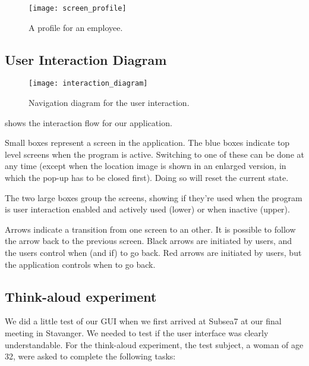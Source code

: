 \begin{figure}[H]
    \centerline{ \texttt{[image: screen\_profile]} }
    \caption{A profile for an employee.}
    \label{fig:screen_profile}
\end{figure}

\clearpage

\subsection{User Interaction Diagram}

\begin{figure}[H]
    \centerline{ \texttt{[image: interaction\_diagram]} }
    \caption{Navigation diagram for the user interaction.}
    \label{fig:interaction}
\end{figure}

 shows the interaction flow for our application.

Small boxes represent a screen in the application. The blue boxes
indicate top level screens when the program is active. Switching to
one of these can be done at any time (except when the location image
is shown in an enlarged version, in which the pop-up has to be closed
first). Doing so will reset the current state.

The two large boxes group the screens, showing if they're used when
the program is user interaction enabled and actively used (lower) or
when inactive (upper).

Arrows indicate a transition from one screen to an other. It is
possible to follow the arrow back to the previous screen. Black arrows
are initiated by users, and the users control when (and if) to go
back. Red arrows are initiated by users, but the application controls
when to go back.



\subsection{Think-aloud experiment}

We did a little test of our GUI when we first arrived at Subsea7 at
our final meeting in Stavanger. We needed to test if the user
interface was clearly understandable. For the think-aloud experiment,
the test subject, a woman of age 32, were asked to complete the following tasks:

